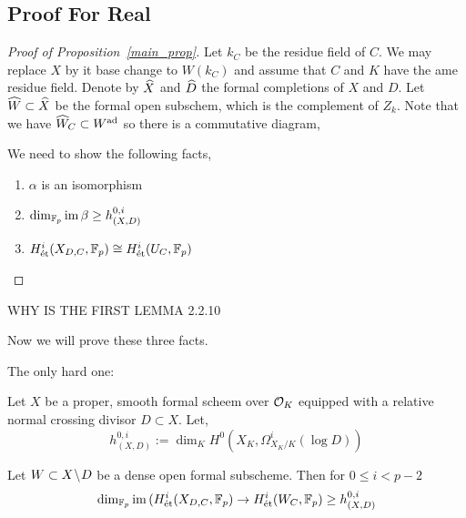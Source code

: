 \documentclass[12pt]{article}
\begin{document}
\subsection{Proof For Real}

\begin{proof}[Proof of Proposition~\ref{main_prop}]
Let $k_C$ be the residue field of $C$. We may replace $X$ by it base change to $W(k_C)$ and assume that $C$ and $K$ have the ame residue field. Denote by $\widehat{X}$ and $\widehat{D}$ the formal completions of $X$ and $D$. Let $\widehat{W} \subset \widehat{X}$ be the formal open subschem, which is the complement of $Z_k$. Note that we have $\widehat{W}_C \subset W^{\mathrm{ad}}$ so there is a commutative diagram,
\begin{center}
\end{center}
We need to show the following facts,
\begin{enumerate}
\item $\alpha$ is an isomorphism
\item $\dim_{\mathbb{F}_p} \operatorname{\mathrm{im}}{\beta} \ge h^{0,i}_{(X,D)}$
\item $H^i_{\text{\'{e}t}}(X_{D,C}, \mathbb{F}_p) \cong H^i_{\text{\'{e}t}}(U_C, \mathbb{F}_p)$
\end{enumerate}
\end{proof}

{\color{red} WHY IS THE FIRST LEMMA 2.2.10}

Now we will prove these three facts. 

The only hard one:

Let $X$ be a proper, smooth formal scheem over $\mathcal{O}_K$ equipped with a relative normal crossing divisor $D \subset X$. Let,
\[ h^{0,i}_{(X,D)} := \dim_K H^0(X_K, \Omega^i_{X_K/K}(\log{D})) \]

\begin{prop}
Let $W \subset X \! \setminus \! D$ be a dense open formal subscheme. Then for $0 \le i < p - 2$
\[ \dim_{\mathbb{F}_p} \operatorname{\mathrm{im}}{(H^i_{\text{\'{e}t}}(X_{D,C}, \mathbb{F}_p) \to H^i_{\text{\'{e}t}}(W_C, \mathbb{F}_p)} \ge h^{0,i}_{(X,D)} \]
\end{prop}
\end{document}
